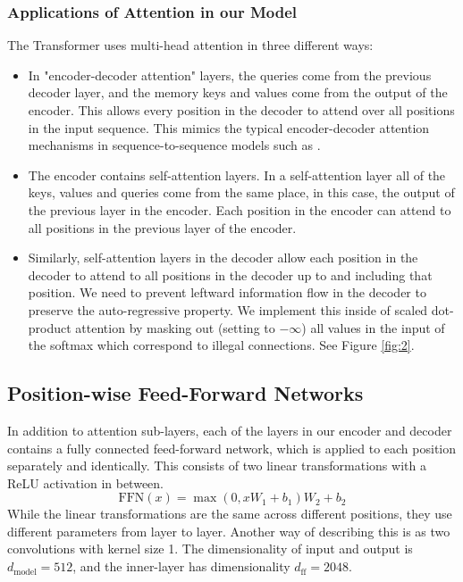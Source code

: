 \documentclass[conference]{IEEEtran}
\begin{document}
\subsubsection{Applications of Attention in our Model}
The Transformer uses multi-head attention in three different ways:
\begin{itemize}
    \item In "encoder-decoder attention" layers, the queries come from the previous decoder layer, and the memory keys and values come from the output of the encoder. This allows every position in the decoder to attend over all positions in the input sequence. This mimics the typical encoder-decoder attention mechanisms in sequence-to-sequence models such as \cite{ref38, ref2, ref9}.
    \item The encoder contains self-attention layers. In a self-attention layer all of the keys, values and queries come from the same place, in this case, the output of the previous layer in the encoder. Each position in the encoder can attend to all positions in the previous layer of the encoder.
    \item Similarly, self-attention layers in the decoder allow each position in the decoder to attend to all positions in the decoder up to and including that position. We need to prevent leftward information flow in the decoder to preserve the auto-regressive property. We implement this inside of scaled dot-product attention by masking out (setting to $-\infty$) all values in the input of the softmax which correspond to illegal connections. See Figure \ref{fig:2}.
\end{itemize}

\subsection{Position-wise Feed-Forward Networks}
In addition to attention sub-layers, each of the layers in our encoder and decoder contains a fully connected feed-forward network, which is applied to each position separately and identically. This consists of two linear transformations with a ReLU activation in between.
\begin{equation}
\text{FFN}(x) = \max(0, xW_1 + b_1) W_2 + b_2
\label{eq:2}
\end{equation}
While the linear transformations are the same across different positions, they use different parameters from layer to layer. Another way of describing this is as two convolutions with kernel size 1. The dimensionality of input and output is $d_{\text{model}} = 512$, and the inner-layer has dimensionality $d_{\text{ff}} = 2048$.
\end{document}

